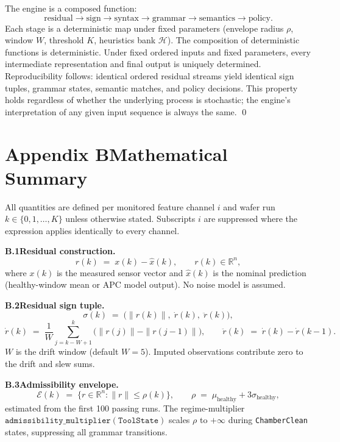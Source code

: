\documentclass[11pt,letterpaper]{article}
\theoremstyle{scresult}
\begin{document}
The engine is a composed function:
\[
\text{residual} \to \text{sign} \to \text{syntax} \to \text{grammar} \to \text{semantics} \to \text{policy}.
\]
Each stage is a deterministic map under fixed parameters (envelope radius
$\rho$, window $W$, threshold $K$, heuristics bank $\mathcal{H}$). The
composition of deterministic functions is deterministic. Under fixed ordered
inputs and fixed parameters, every intermediate representation and final output
is uniquely determined. Reproducibility follows: identical ordered residual
streams yield identical sign tuples, grammar states, semantic matches, and
policy decisions. This property holds regardless of whether the underlying
process is stochastic; the engine's interpretation of any given input sequence
is always the same. \qed



\clearpage
\section*{Appendix B\quad Mathematical Summary}
\label{app:math}
\footnotesize
\noindent All quantities are defined per monitored feature channel $i$ and wafer
run $k \in \{0,1,\ldots,K\}$ unless otherwise stated. Subscripts $i$ are
suppressed where the expression applies identically to every channel.

\medskip
\noindent\textbf{B.1\quad Residual construction.}
\[
  r(k) \;=\; x(k) - \hat{x}(k), \qquad r(k) \in \mathbb{R}^n,
\]
where $x(k)$ is the measured sensor vector and $\hat{x}(k)$ is the nominal
prediction (healthy-window mean or APC model output).  No noise model is
assumed.

\medskip
\noindent\textbf{B.2\quad Residual sign tuple.}
\[
  \sigma(k) \;=\; \bigl(\|r(k)\|,\;\dot{r}(k),\;\ddot{r}(k)\bigr),
\]
\[
  \dot{r}(k) \;=\; \frac{1}{W}\sum_{j=k-W+1}^{k}\bigl(\|r(j)\| - \|r(j-1)\|\bigr),
  \qquad
  \ddot{r}(k) \;=\; \dot{r}(k) - \dot{r}(k-1).
\]
$W$ is the drift window (default $W=5$).  Imputed observations contribute
zero to the drift and slew sums.

\medskip
\noindent\textbf{B.3\quad Admissibility envelope.}
\[
  \mathcal{E}(k) \;=\; \bigl\{r \in \mathbb{R}^n : \|r\| \leq \rho(k)\bigr\},
  \qquad
  \rho \;=\; \mu_{\text{healthy}} + 3\sigma_{\text{healthy}},
\]
estimated from the first 100 passing runs.  The regime-multiplier
$\texttt{admissibility\_multiplier}(\texttt{ToolState})$ scales $\rho$ to
$+\infty$ during \texttt{ChamberClean} states, suppressing all grammar
transitions.
\end{document}
